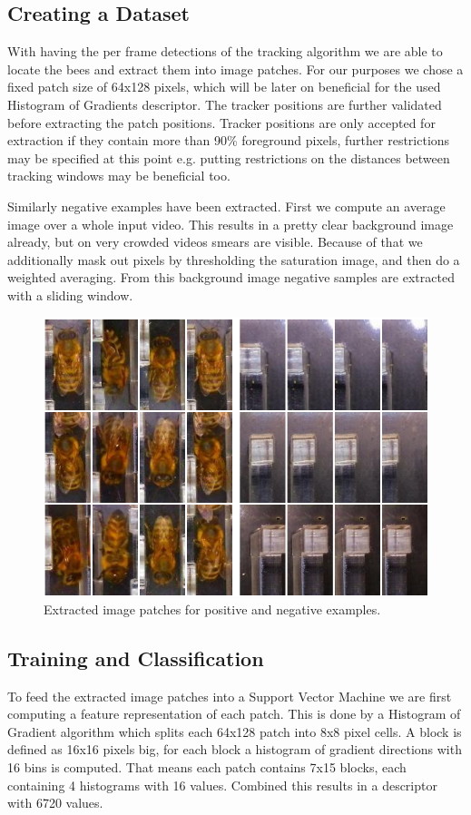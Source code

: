 \documentclass[10pt,a4paper]{article}
\begin{document}
\subsection{Creating a Dataset}
With having the per frame detections of the tracking algorithm we are able to locate the bees and extract them into image patches. For our purposes we chose a fixed patch size of 64x128 pixels, which will be later on beneficial for the used Histogram of Gradients descriptor. The tracker positions are further validated before extracting the patch positions. Tracker positions are only accepted for extraction if they contain more than 90\% foreground pixels, further restrictions may be specified at this point e.g. putting restrictions on the distances between tracking windows may be beneficial too.

Similarly negative examples have been extracted. First we compute an average image over a whole input video. This results in a pretty clear background image already, but on very crowded videos smears are visible. Because of that we additionally mask out pixels by thresholding the saturation image, and then do a weighted averaging. From this background image negative samples are extracted with a sliding window.

\begin{figure}
\label{fig:datasetsample}
\center
\includegraphics[width=1.0\textwidth]{datasetsample}
\caption{Extracted image patches for positive and negative examples.}
\end{figure}

\subsection{Training and Classification} 
To feed the extracted image patches into a Support Vector Machine we are first computing a feature representation of each patch. This is done by a Histogram of Gradient algorithm which splits each 64x128 patch into 8x8 pixel cells. A block is defined as 16x16 pixels big, for each block a histogram of gradient directions with 16 bins is computed. That means each patch contains 7x15 blocks, each containing 4 histograms with 16 values. Combined this results in a descriptor with 6720 values. 
\end{document}
